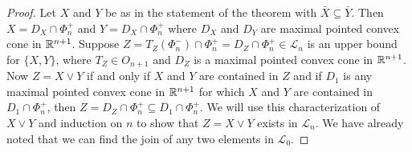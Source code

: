 \documentclass[psamsfonts]{amsart}
\numberwithin{equation}{subsection}
\theoremstyle{plain}
\theoremstyle{definition}
\theoremstyle{remark}
\begin{document}
\begin{proof} Let $X$ and $Y$ be as in the statement of the theorem with $\bar{X} \subseteq \bar{Y}$. Then 
$X = D_X \cap \Phi_n^+$ and $Y = D_X \cap \Phi_n^+$ where $D_X$ and $D_Y$ are maximal pointed convex cone in $\Bbb{R}^{n + 1}$. 
Suppose  $Z =  T_Z(\Phi_n^-)\cap \Phi_n^+  =  D_Z\cap \Phi_n^+ \in \mathcal{L}_n$ is  an upper bound for $\{X, Y\}$, where $T_Z \in O_{n + 1}$ and $D_Z$ is a maximal pointed convex cone in $\Bbb{R}^{n + 1}$. 
 Now  $Z = X \vee Y$ if and only if $X$ and $Y$ are contained in $Z$ and if $D_1$ is any  maximal pointed convex cone in 
$\Bbb{R}^{n + 1}$ for which $X$ and $Y$ are contained in $D_1 \cap \Phi^+_n$, then $Z = D_Z \cap  \Phi^+_n \subseteq D_1 \cap  \Phi^+_n$. 
We will use this characterization of $X\vee Y$ and  induction on $n$ to show that $Z = X\vee Y$ exists in $\mathcal{L}_n$. 
We have already noted that  we can find the join of any two elements in $\mathcal{L}_0$.


\end{proof}
\end{document}
